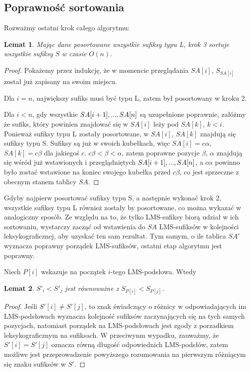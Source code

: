 \documentclass[12pt]{article}
\newtheorem{lemma}{Lemat}
\newcommand{\elps}{\makebox[.8em][c]{.\hfil.\hfil.}}
\begin{document}
\subsection*{Poprawność sortowania}

Rozważmy ostatni krok całego algorytmu:

\begin{lemma}
	Mając dane posortowane wszystkie sufiksy typu L, krok 3 sortuje wszystkie
	sufiksy $S$ w czasie $O(n)$.
\end{lemma}

\begin{proof}
Pokażemy przez indukcję, że w momencie przeglądania $SA[i]$, $S_{SA[i]}$
został już zapisany na swoim miejscu.

\item Dla $i = n$, największy sufiks musi być typu L, zatem był posortowany w
kroku 2.

\item Dla $i < n$, gdy wszystkie $SA[i+1], \elps, SA[n]$ są uzupełnione
poprawnie, załóżmy że sufiks, który powinien znajdować się w $SA[i]$ leży
pod $SA[k]$, $k < i$. Ponieważ sufiksy typu L zostały posortowane, w
$SA[i]$, $SA[k]$ znajdują się sufiksy typu S. Sufiksy są już w swoich
kubełkach, więc $SA[i] = c\alpha$, $SA[k] = c\beta$ dla jakiegoś $c$.
$c\beta < \beta < \alpha$, zatem poprawne pozycje $\beta$, $\alpha$
znajdują się wśród już wstawionych i przeglądniętych $SA[i+1], \elps,
SA[n]$, a $c\alpha$ powinno było zostać wstawione na koniec swojego kubełka
przed $c\beta$, co jest sprzeczne z obecnym stanem tablicy $SA$.
\end{proof}

Gdyby najpierw posortować sufiksy typu S, a następnie wykonać krok 2, wszystkie
sufiksy typu L również zostały by posortowane, co można wykazać w analogiczny
sposób. Ze względu na to, że tylko LMS-sufiksy biorą udział w ich sortowaniu,
wystarczy zacząć od wstawienia do $SA$ LMS-sufiksów w kolejności
leksykograficznej, aby uzyskać ten sam rezultat. Tym samym, o ile tablica $SA'$
wyznacza poprawny porządek LMS-sufiksów, ostatni etap algorytmu jest poprawny.

Niech $P[i]$ wskazuje na początek $i$-tego LMS-podsłowa. Wtedy

\begin{lemma}
	$S'_i < S'_j$ jest równoważne z $S_{P[i]} < S_{P[j]}$.
\end{lemma}

\begin{proof}
	Jeśli $S'[i] \neq S'[j]$, to znak świadczący o różnicy w odpowiadających im
	LMS-podsłowach wyznacza kolejność sufiksów zaczynających się na tych samych
	pozycjach, natomiast porządek na LMS-podsłowach jest zgody z porzadkiem
	leksykograficznym na sufiksach. W przeciwynm wypadku, zauważmy, że $S'[i] =
	S'[j]$ oznacza równą długość odpowiednich LMS-podsłów, zatem
	możliwe jest przeprowadzenie powyższego rozumowania na pierwszym różniącym
	się znaku sufiksów w $S'$.
\end{proof}
\end{document}
